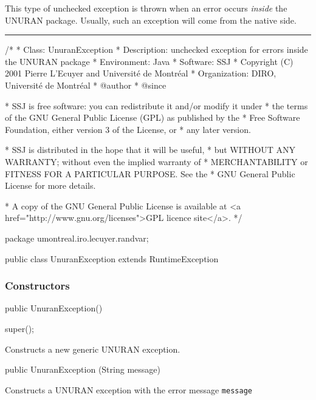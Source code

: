 
This type of unchecked exception is thrown when an error occurs
\emph{inside} the UNURAN package.  
Usually, such an exception will come from the native side.

\bigskip\hrule

\begin{code}
\begin{hide}
/*
 * Class:        UnuranException
 * Description:  unchecked exception for errors inside the UNURAN package
 * Environment:  Java
 * Software:     SSJ 
 * Copyright (C) 2001  Pierre L'Ecuyer and Université de Montréal
 * Organization: DIRO, Université de Montréal
 * @author       
 * @since

 * SSJ is free software: you can redistribute it and/or modify it under
 * the terms of the GNU General Public License (GPL) as published by the
 * Free Software Foundation, either version 3 of the License, or
 * any later version.

 * SSJ is distributed in the hope that it will be useful,
 * but WITHOUT ANY WARRANTY; without even the implied warranty of
 * MERCHANTABILITY or FITNESS FOR A PARTICULAR PURPOSE.  See the
 * GNU General Public License for more details.

 * A copy of the GNU General Public License is available at
   <a href="http://www.gnu.org/licenses">GPL licence site</a>.
 */
\end{hide}
package umontreal.iro.lecuyer.randvar;

public class UnuranException extends RuntimeException\begin{hide} {\end{hide}
\end{code}

\subsubsection* {Constructors}
\begin{code}
   public UnuranException()\begin{hide} {
      super();
   }\end{hide}
\end{code}
\begin{tabb}   Constructs a new generic UNURAN exception.
\end{tabb}
\begin{code}

   public UnuranException (String message)\begin{hide} {
      super (message);
   }
}\end{hide}
\end{code}
\begin{tabb}   Constructs a UNURAN exception with the error
   message \texttt{message}
\end{tabb}
\begin{htmlonly}
\end{htmlonly}
